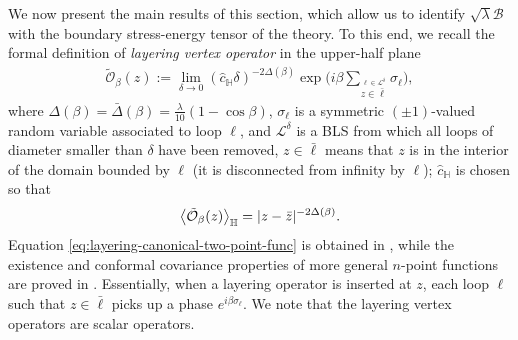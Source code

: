 \documentclass[a4paper,11pt]{article}
\begin{document}
We now present the main results of this section, which allow us to identify $\sqrt{\lambda}\mathcal{B}$ with the boundary stress-energy tensor of the theory. To this end, we recall the formal definition of \emph{layering vertex operator} in the upper-half plane \cite{Camia_2020}
\begin{align} \label{def:tildeO}
    \tilde{\mathcal{O}}_{\beta}(z) := \lim_{\delta \to 0} (\hat{c}_{\mathbb{H}}\delta)^{-2\Delta(\beta)} \exp{\Big(i \beta \sum_{\stackrel{\ell \in \mathcal{L}^{\delta} }{z \in \bar\ell}} \sigma_{\ell} \Big)},
\end{align}
where $\Delta(\beta) = \bar{\Delta}(\beta) = \frac{\lambda}{10}(1-\cos\beta)$, $\sigma_{\ell}$ is a symmetric $(\pm 1)$-valued random variable associated to loop $\ell$, and $\mathcal{L}^{\delta}$ is a BLS from which all loops of diameter smaller than $\delta$ have been removed, $z \in \bar\ell$ means that $z$ is in the interior of the domain bounded by $\ell$ (it is disconnected from infinity by $\ell$); $\hat{c}_{\mathbb{H}}$ is chosen so that
\begin{equation} \label{eq:layering-canonical-two-point-func}
\Braket{\tilde{\mathcal{O}}_{\beta}(z)}_{\mathbb H} = |z-\bar{z}|^{-2\Delta(\beta)}.
\end{equation}
Equation \eqref{eq:layering-canonical-two-point-func} is obtained in \cite{Camia_2020}, while the existence and conformal covariance properties of more general $n$-point functions are proved in \cite{Camia_2016}.
Essentially, when a layering operator is inserted at $z$, each loop $\ell$ such that $z \in \bar\ell$ picks up a phase $e^{i \beta\sigma_{\ell}}$. We note that the layering vertex operators are scalar operators.
\end{document}
